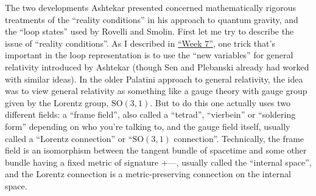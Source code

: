 \documentclass[12pt]{article}
\begin{document}
The two developments Ashtekar presented concerned mathematically
rigorous treatments of the ``reality conditions'' in his approach to
quantum gravity, and the ``loop states'' used by Rovelli and Smolin.
First let me try to describe the issue of ``reality conditions''. As I
described in \protect\hyperlink{week7}{``Week 7''}, one trick that's
important in the loop representation is to use the ``new variables'' for
general relativity introduced by Ashtekar (though Sen and Plebanski
already had worked with similar ideas). In the older Palatini approach
to general relativity, the idea was to view general relativity as
something like a gauge theory with gauge group given by the Lorentz
group, \(\mathrm{SO}(3,1)\). But to do this one actually uses two
different fields: a ``frame field'', also called a ``tetrad'',
``vierbein'' or ``soldering form'' depending on who you're talking to,
and the gauge field itself, usually called a ``Lorentz connection'' or
``\(\mathrm{SO}(3,1)\) connection''. Technically, the frame field is an
isomorphism between the tangent bundle of spacetime and some other
bundle having a fixed metric of signature +---, usually called the
``internal space'', and the Lorentz connection is a metric-preserving
connection on the internal space.
\end{document}
